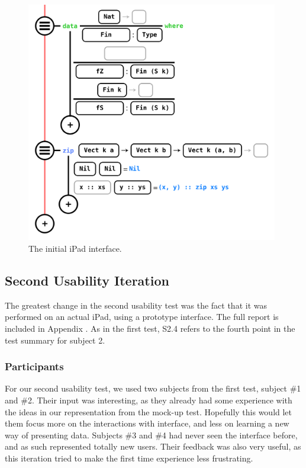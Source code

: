 \begin{figure}
	\centering
		\includegraphics[width=110mm]{diagrams/ipad_interface.PNG}
	\caption{The initial iPad interface.}
\label{fig:initialiPadInterface}
\end{figure}

\subsection{Second Usability Iteration}
\label{sec:SecondUsabilityTest}
The greatest change in the second usability test was the fact that it was
performed on an actual iPad, using a prototype interface. The full report is
included in Appendix . As in the first test, S2.4 refers to
the fourth point in the test summary for subject 2.

\subsubsection{Participants}
For our second usability test, we used two subjects from the first test,
subject \#1 and \#2. Their input was interesting, as they already had some
experience with the ideas in our representation from the mock-up test.
Hopefully this would let them focus more on the interactions with interface,
and less on learning a new way of presenting data. Subjects \#3 and \#4 had
never seen the interface before, and as such represented totally new users.
Their feedback was also very useful, as this iteration tried to make the first
time experience less frustrating.

